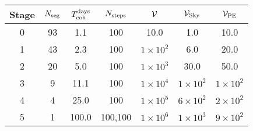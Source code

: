 \begin{tabular}{c|cccccc}
Stage & $N_{\rm seg}$ & $T_{\rm coh}^{\rm days}$ &$N_{\rm steps}$ & $\mathcal{V}$ & $\mathcal{V}_{\rm Sky}$ & $\mathcal{V}_{\rm PE}$ \\ \hline
0 & 93 & 1.1 & 100 & 10.0 & 1.0 & 10.0 \\
1 & 43 & 2.3 & 100 & $1{\times}10^{2}$ & 6.0 & 20.0 \\
2 & 20 & 5.0 & 100 & $1{\times}10^{3}$ & 30.0 & 50.0 \\
3 & 9 & 11.1 & 100 & $1{\times}10^{4}$ & $1{\times}10^{2}$ & $1{\times}10^{2}$ \\
4 & 4 & 25.0 & 100 & $1{\times}10^{5}$ & $6{\times}10^{2}$ & $2{\times}10^{2}$ \\
5 & 1 & 100.0 & 100,100 & $1{\times}10^{6}$ & $1{\times}10^{3}$ & $9{\times}10^{2}$ \\
\end{tabular}
